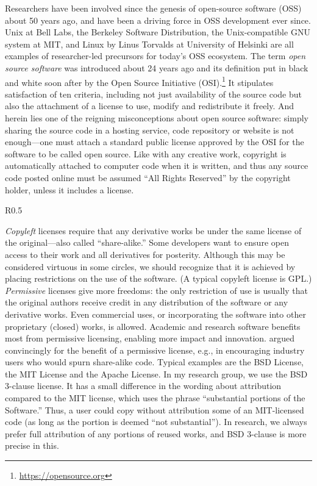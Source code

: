 \documentclass{statement}
\newlength{\up}
\begin{document}
Researchers have been involved since the genesis of open-source software (OSS) about 50 years ago, and have been a driving force in OSS development ever since. 
Unix at Bell Labs, the Berkeley Software Distribution, the Unix-compatible GNU system at MIT, and Linux by Linus Torvalds at University of Helsinki are all examples of researcher-led precursors for today's OSS ecosystem.  
The term \emph{open source software} was introduced about 24 years ago \citep{peterson2008} and its definition put in black and white soon after by the Open Source Initiative (OSI).\footnote{\url{https://opensource.org}} 
It stipulates satisfaction of ten criteria, including not just availability of the source code but also the attachment of a license to use, modify and redistribute it freely. 
And herein lies one of the reigning misconceptions about open source software: simply sharing the source code in a hosting service, code repository or website is not enough---one must attach a standard public license approved by the OSI for the software to be called open source. 
Like with any creative work, copyright is automatically attached to computer code when it is written, and thus any source code posted online must be assumed ``All Rights Reserved'' by the copyright holder, unless it includes a license. 


\begin{wrapfigure}{R}{0.5\textwidth}
\vspace{-0.6cm}
\begin{tcolorbox}[title=Copyleft vs. permissive OSS licenses, arc=0mm,,boxrule=0.5pt]
\footnotesize \textsf{
\emph{Copyleft} licenses require that any derivative works be under the same license of the original---also called ``share-alike.'' 
Some developers want to ensure open access to their work and all derivatives for  posterity. 
Although this may be considered virtuous in some circles, we should recognize that it is achieved by placing restrictions on the use of the software. 
(A typical copyleft license is GPL.) 
\emph{Permissive} licenses give more freedoms: the only restriction of use is usually that the original authors receive credit in any distribution of the software or any derivative works. 
Even commercial uses, or incorporating the software into other proprietary (closed) works, is allowed. 
Academic and research software benefits most from permissive licensing, enabling more impact and innovation. 
\cite{hunter2004} argued convincingly for the benefit of a permissive license, e.g., in encouraging industry users who would spurn share-alike code.
Typical examples are the BSD License, the MIT License and the Apache License.
In my research group, we use the BSD 3-clause license. It has a small difference in the wording about attribution compared to the MIT license, which uses the phrase ``substantial portions of the Software.'' Thus, a user could copy without attribution some of an MIT-licensed code (as long as the portion is deemed ``not substantial''). In research, we always prefer full attribution of any portions of reused works, and BSD 3-clause is more precise in this.}
\end{tcolorbox}
\end{wrapfigure}
\end{document}
